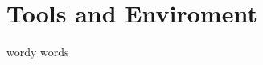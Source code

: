\documentclass[main.tex]{subfiles}
\begin{document}
\chapter{Tools and Enviroment}

wordy words
\end{document}
